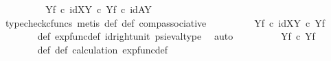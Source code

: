\begin{isabellebody}
\ \ \ \ \isamarkupfalse%
\ \isamarkupfalse%
\ {\isachardoublequoteopen}{\isachardot}{\kern0pt}{\isachardot}{\kern0pt}{\isachardot}{\kern0pt}\ {\isacharequal}{\kern0pt}\ {\isasymphi}\isactrlbsup Y\isactrlesup \isactrlsub f\ {\isasymcirc}\isactrlsub c\ {\isacharparenleft}{\kern0pt}id{\isacharparenleft}{\kern0pt}X\isactrlbsup Y\isactrlesup {\isacharparenright}{\kern0pt}\ {\isasymcirc}\isactrlsub c\ {\isacharparenleft}{\kern0pt}{\isasympsi}\isactrlbsup Y\isactrlesup \isactrlsub f\ {\isasymcirc}\isactrlsub c\ id{\isacharparenleft}{\kern0pt}A\isactrlbsup Y\isactrlesup {\isacharparenright}{\kern0pt}{\isacharparenright}{\kern0pt}{\isacharparenright}{\kern0pt}{\isachardoublequoteclose}\ \isanewline
\ \ \ \ \ \ \isamarkupfalse%
\ {\isacharparenleft}{\kern0pt}typecheck{\isacharunderscore}{\kern0pt}cfuncs{\isacharcomma}{\kern0pt}\ metis\ {\isasymphi}{\isacharunderscore}{\kern0pt}def\ {\isasympsi}{\isacharunderscore}{\kern0pt}def\ comp{\isacharunderscore}{\kern0pt}associative{}{\isacharparenright}{\kern0pt}\isanewline
\ \ \ \ \isamarkupfalse%
\ \isamarkupfalse%
\ {\isachardoublequoteopen}{\isachardot}{\kern0pt}{\isachardot}{\kern0pt}{\isachardot}{\kern0pt}\ {\isacharequal}{\kern0pt}\ {\isasymphi}\isactrlbsup Y\isactrlesup \isactrlsub f\ {\isasymcirc}\isactrlsub c\ {\isacharparenleft}{\kern0pt}id{\isacharparenleft}{\kern0pt}X\isactrlbsup Y\isactrlesup {\isacharparenright}{\kern0pt}\ {\isasymcirc}\isactrlsub c\ {\isasympsi}\isactrlbsup Y\isactrlesup \isactrlsub f\ {\isacharparenright}{\kern0pt}{\isachardoublequoteclose}\isanewline
\ \ \ \ \ \ \isamarkupfalse%
\ {\isasympsi}{\isacharunderscore}{\kern0pt}def\ exp{\isacharunderscore}{\kern0pt}func{\isacharunderscore}{\kern0pt}def{}\ id{\isacharunderscore}{\kern0pt}right{\isacharunderscore}{\kern0pt}unit{}\ psi{\isacharunderscore}{\kern0pt}eval{\isacharunderscore}{\kern0pt}type\ \isamarkupfalse%
\ auto\isanewline
\ \ \ \ \isamarkupfalse%
\ \isamarkupfalse%
\ {\isachardoublequoteopen}{\isachardot}{\kern0pt}{\isachardot}{\kern0pt}{\isachardot}{\kern0pt}\ {\isacharequal}{\kern0pt}\ {\isasymphi}\isactrlbsup Y\isactrlesup \isactrlsub f\ {\isasymcirc}\isactrlsub c\ {\isasympsi}\isactrlbsup Y\isactrlesup \isactrlsub f{\isachardoublequoteclose}\isanewline
\ \ \ \ \ \ \isamarkupfalse%
\ {\isasymphi}{\isacharunderscore}{\kern0pt}def\ {\isasympsi}{\isacharunderscore}{\kern0pt}def\ calculation\ exp{\isacharunderscore}{\kern0pt}func{\isacharunderscore}{\kern0pt}def{}\ \isamarkupfalse%

\end{isabellebody}
